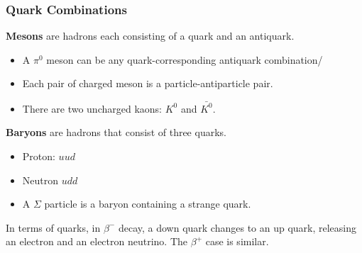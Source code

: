 \subsubsection*{Quark Combinations}

\textbf{Mesons} are hadrons each consisting of a quark and an antiquark.
\begin{itemize}
    \item A $\pi^0$ meson can be any quark-corresponding antiquark combination/
    \item Each pair of charged meson is a particle-antiparticle pair.
    \item There are two uncharged kaons: $K^0$ and $\bar{K^0}$.
\end{itemize}

\textbf{Baryons} are hadrons that consist of three quarks. 
\begin{itemize}
    \item Proton: $uud$
    \item Neutron $udd$
    \item A $\Sigma$ particle is a baryon containing a strange quark.
\end{itemize}

In terms of quarks, in $\beta^-$ decay, a down quark changes to an up quark, releasing an electron and an electron neutrino. The $\beta^+$ case is similar.
